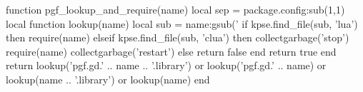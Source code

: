 \newcommand{\foo}{\makebox[0pt]{\textbullet}\hskip-0.5pt\vrule width 1pt\hspace{\labelsep}}



\usepackage{luacode}
\usepackage{tikz}

\usetikzlibrary{graphdrawing,arrows, calc, math, decorations.markings, positioning}
\begin{luacode*}
	function pgf_lookup_and_require(name)
	local sep = package.config:sub(1,1)
	local function lookup(name)
	local sub = name:gsub('%
	if kpse.find_file(sub, 'lua') then
	require(name)
	elseif kpse.find_file(sub, 'clua') then
	collectgarbage('stop')
	require(name)
	collectgarbage('restart')
	else
	return false
	end
	return true
	end
	return
	lookup('pgf.gd.' .. name .. '.library') or
	lookup('pgf.gd.' .. name) or
	lookup(name .. '.library') or
	lookup(name)
	end
\end{luacode*}
\usepackage[compat=1.1.0]{tikz-feynman}
\usepackage{svg}

\usepackage{xspace} 

\usepackage[backend=biber,sorting=none,style=nature]{biblatex}
\usepackage[font=small]{caption}
\renewcommand{\footnotesize}{\scriptsize}




\usepackage{amsmath}
\usepackage{amsfonts}
\usepackage{amssymb}
    \newcommand{\bra}[1]{\ensuremath{\left\langle#1\right|}}
\newcommand{\ket}[1]{\ensuremath{\left|#1\right\rangle}}
\newcommand{\bracket}[2]{\ensuremath{\left\langle #1 \middle| #2 \right\rangle}}
\newcommand{\matrixel}[3]{\ensuremath{\left\langle #1 \middle| #2 \middle| #3 \right\rangle}}

\usepackage[absolute,overlay]{textpos}
\usepackage{ifthen}

\usepackage{slashed}
\usepackage{subcaption}


\usepackage{xfp}
\usepackage{import}
\usetikzlibrary{calc}
\usetikzlibrary{external}


\usepackage{xcolor}
\usepackage{contour}
\usepackage{mathtools}
\usepackage{physics}

\renewcommand{\i}{{\mathrm{i}}}
\newcommand{\defeq}{\vcentcolon=}
\newcommand{\eqdef}{=\vcentcolon}

\usepackage[makeroom]{cancel}


\usepackage{color, colortbl,booktabs}
